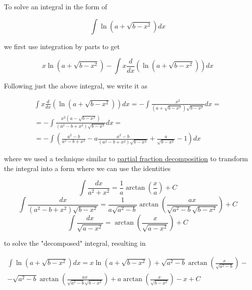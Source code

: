 ﻿\documentclass{article}
\begin{document}
To solve an integral in the form of

\begin{equation*}
    \int \ln \left( a + \sqrt{b - x^2} \right) dx
\end{equation*}

we first use integration by parts to get

\begin{equation*}
    x \ln \left( a + \sqrt{b - x^2} \right) - \int x \frac{d}{dx} \left( \ln \left( a + \sqrt{b - x^2} \right) \right) dx
\end{equation*}

Following just the above integral, we write it as

\begin{multline*}
    \int x \frac{d}{dx} \left( \ln \left( a + \sqrt{b - x^2} \right) \right) dx = - \int \frac{x^2}{(a + \sqrt{b - x^2}) \sqrt{b - x^2}} dx = \\
    = - \int \frac{x^2 (a - \sqrt{b - x^2})}{(a^2 - b + x^2) \sqrt{b - x^2}} dx = \\
    = - \int \left( \frac{a^2 - b}{a^2 - b + x^2} - a \frac{a^2 - b}{(a^2 - b + x^2) \sqrt{b - x^2}} + \frac{a}{\sqrt{b - x^2}} - 1 \right) dx
\end{multline*}

where we used a technique similar to \href{https://en.wikipedia.org/wiki/Partial_fraction_decomposition}{partial fraction decomposition} to transform the integral into a form where we can use the identities

\begin{equation*}
    \int \frac{dx}{a^2 + x^2} = \frac{1}{a} \arctan \left( \frac{x}{a} \right) + C
\end{equation*}
\begin{equation*}
    \int \frac{dx}{(a^2 - b + x^2) \sqrt{b - x^2}} = \frac{1}{a \sqrt{a^2 - b}} \arctan \left( \frac{ax}{\sqrt{a^2 - b} \sqrt{b - x^2}} \right) + C
\end{equation*}
\begin{equation*}
    \int \frac{dx}{\sqrt{a - x^2}} = \arctan \left( \frac{x}{\sqrt{a - x^2}} \right) + C
\end{equation*}

to solve the "decomposed" integral, resulting in

\begin{multline*}
    \int \ln \left( a + \sqrt{b - x^2} \right) dx = x \ln \left( a + \sqrt{b - x^2} \right) + \sqrt{a^2 - b} \arctan \left( \frac{x}{\sqrt{a^2 - b}} \right) - \\
    - \sqrt{a^2 - b} \arctan \left( \frac{ax}{\sqrt{a^2 - b} \sqrt{b - x^2}} \right) + a \arctan \left( \frac{x}{\sqrt{b - x^2}} \right) - x + C
\end{multline*}
\end{document}
